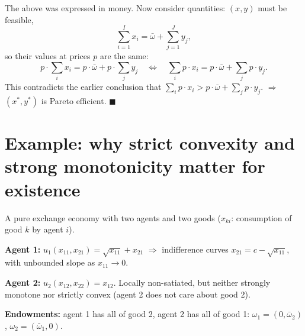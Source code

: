 \documentclass[11pt]{article}
\begin{document}
 The above was expressed in money. Now consider quantities:
$(x,y)$ must be feasible,
\[ \sum_{i=1}^{I}x_i=\bar\omega+\sum_{j=1}^{J}y_j , \]
so their values at prices $p$ are the same:
\[ p\cdot\sum_{i}x_i=p\cdot\bar\omega+p\cdot\sum_{j}y_j
   \quad\Longleftrightarrow\quad
   \sum_{i}p\cdot x_i=p\cdot\bar\omega+\sum_{j}p\cdot y_j . \]
This contradicts the earlier conclusion that
$\sum_i p\cdot x_i>p\cdot\bar\omega+\sum_j p\cdot y_j$. $\Rightarrow$ $(x^*,y^*)$ is Pareto
efficient. \hfill$\blacksquare$


\section{Example: why strict convexity and strong monotonicity matter for existence}

A pure exchange economy with two agents and two goods ($x_{ki}$: consumption of good $k$ by
agent $i$).

\begin{flatlist}
  \item \textbf{Agent 1:} $u_1(x_{11},x_{21})=\sqrt{x_{11}}+x_{21}$ $\Rightarrow$
        indifference curves $x_{21}=c-\sqrt{x_{11}}$, with unbounded slope as
        $x_{11}\to 0$.
  \item \textbf{Agent 2:} $u_2(x_{12},x_{22})=x_{12}$. Locally non-satiated, but neither
        strongly monotone nor strictly convex (agent 2 does not care about good 2).
  \item \textbf{Endowments:} agent 1 has all of good 2, agent 2 has all of good 1:
        $\omega_1=(0,\bar\omega_2)$, $\omega_2=(\bar\omega_1,0)$.
\end{flatlist}
\end{document}
